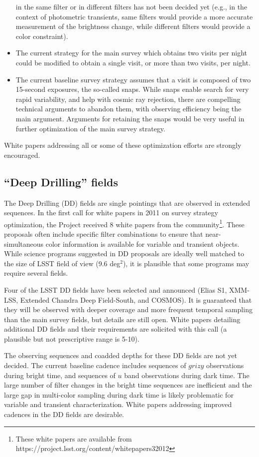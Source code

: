 \documentclass[DM,lsstdraft,toc,usenatbib]{lsstdoc}
\begin{document}
\begin{itemize}
in the same filter or in different filters has not been decided yet (e.g., in the context
of photometric transients, same filters would provide a more accurate measurement
of the brightness change, while different filters would provide a color constraint). 
\item The current strategy for the main survey which obtains two visits per night could be 
modified to obtain a single visit, or more than two visits, per night. 
\item The current baseline survey strategy assumes that a visit is composed of two 15-second
exposures, the so-called snaps. While snaps enable search for very rapid variability,
and help with cosmic ray rejection, there are compelling technical arguments to abandon
them, with observing efficiency being the main argument. Arguments for retaining the
snaps would be very useful in further optimization of the main survey strategy. 
\end{itemize}
White papers addressing all or some of these optimization efforts are strongly encouraged.


\subsection{``Deep Drilling'' fields} 

The Deep Drilling (DD) fields are single pointings that are observed in extended sequences. 
In the first call for white papers in 2011 on survey strategy optimization, the Project received 
8 white papers from the community\footnote{These white papers are available from 
https://project.lsst.org/content/whitepapers32012}. These proposals often include specific 
filter combinations to ensure that near-simultaneous color information is available for 
variable and transient objects. While science programs suggested in DD proposals are ideally well 
matched to the size of LSST field of view (9.6 deg$^2$), it is plausible that some
programs may require several fields. 

Four of the LSST DD fields have been selected and announced (Elias S1, 
XMM-LSS, Extended Chandra Deep Field-South, and COSMOS). It is guaranteed that they 
will be observed with deeper coverage and more frequent temporal sampling than the main 
survey fields, but details are still open. White papers detailing additional DD fields and their
requirements are solicited with this call (a plausible but not prescriptive range is 5-10).

The observing sequences and coadded depths for these DD fields are not yet decided. The current baseline
cadence includes sequences of $grizy$ observations during bright time, and sequences of $u$ 
band observations during dark time. The large number of filter changes in the bright time sequences
are inefficient and the large gap in multi-color sampling during dark time is likely problematic 
for variable and transient characterization. White papers addressing improved cadences 
in the DD fields are desirable.
\end{document}
